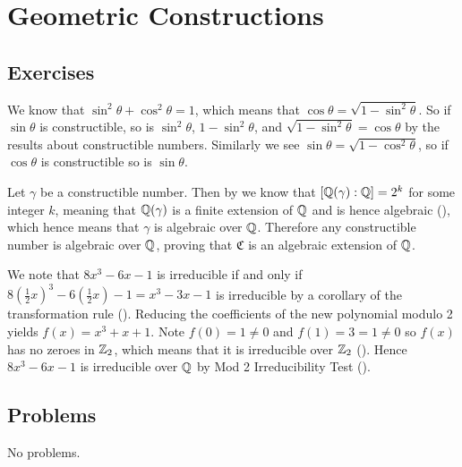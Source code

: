 \section{Geometric Constructions}
\subsection*{Exercises}
\begin{questions}
    \item We know that $\sin^2\theta + \cos^2\theta = 1$, which means that $\cos\theta = \sqrt{1-\sin^2\theta}$. So if $\sin\theta$ is constructible, so is $\sin^2\theta$, $1 - \sin^2\theta$, and $\sqrt{1-\sin^2\theta} = \cos\theta$ by the results about constructible numbers. Similarly we see $\sin\theta = \sqrt{1-\cos^2\theta}$, so if $\cos\theta$ is constructible so is $\sin\theta$.

    \item Let $\gamma$ be a constructible number. Then by  we know that $[\mathbb{Q}(\gamma):\mathbb{Q}] = 2^k$ for some integer $k$, meaning that $\mathbb{Q}(\gamma)$ is a finite extension of $\mathbb{Q}$ and is hence algebraic (), which hence means that $\gamma$ is algebraic over $\mathbb{Q}$. Therefore any constructible number is algebraic over $\mathbb{Q}$, proving that $\mathfrak{C}$ is an algebraic extension of $\mathbb{Q}$.

    \item We note that $8x^3 - 6x - 1$ is irreducible if and only if $8\left(\frac12x\right)^3 - 6\left(\frac12x\right) - 1 = x^3 - 3x - 1$ is irreducible by a corollary of the transformation rule (). Reducing the coefficients of the new polynomial modulo 2 yields $f(x) = x^3 + x + 1$. Note $f(0) = 1 \neq 0$ and $f(1) = 3 = 1 \neq 0$ so $f(x)$ has no zeroes in $\mathbb{Z}_2$, which means that it is irreducible over $\mathbb{Z}_2$ (). Hence $8x^3 - 6x - 1$ is irreducible over $\mathbb{Q}$ by Mod 2 Irreducibility Test ().
\end{questions}

\subsection*{Problems}
No problems.
